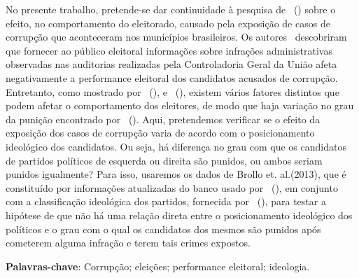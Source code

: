 \documentclass[
	12pt,				%
	openright,			%
	twoside,			%
	a4paper,			%
	openany,
	english,			%
	brazil				%
	]{abntex2}
\begin{document}
\setlength{\absparsep}{18pt} %
\begin{resumo}

No presente trabalho, pretende-se dar continuidade à pesquisa de ~(\citeyear{ferraz2008exposing}) sobre o efeito, no comportamento do eleitorado, causado pela exposição de casos de corrupção que aconteceram nos municípios brasileiros. Os autores~\cite{ferraz2008exposing} descobriram que fornecer ao público eleitoral informações sobre infrações administrativas observadas nas auditorias realizadas pela Controladoria Geral da União afeta negativamente a performance eleitoral dos candidatos acusados de corrupção. Entretanto, como mostrado por ~(\citeyear{Botero2021Apr}), \cite{dunning2019voter} e ~(\citeyear{Boas2019Apr}), existem vários fatores distintos que podem afetar o comportamento dos eleitores, de modo que haja variação no grau da punição encontrado por ~(\citeyear{ferraz2008exposing}).
Aqui, pretendemos verificar se o efeito da exposição dos casos de corrupção varia de acordo com o posicionamento ideológico dos candidatos. Ou seja, há diferença no grau com que os candidatos de partidos políticos de esquerda ou direita são punidos, ou ambos seriam punidos igualmente? Para isso, usaremos os dados de Brollo et. al.(2013), que é constituído por informações atualizadas do banco usado por ~(\citeyear{ferraz2008exposing}), em conjunto com a classificação ideológica dos partidos, fornecida por ~(\citeyear{Bolognesi2022Sep}), para testar a hipótese de que não há uma relação direta entre o posicionamento ideológico dos políticos e o grau com o qual os candidatos dos mesmos são punidos após cometerem alguma infração e terem tais crimes expostos.

\textbf{Palavras-chave}: Corrupção; eleições; performance eleitoral; ideologia.

\end{resumo}
\end{document}
